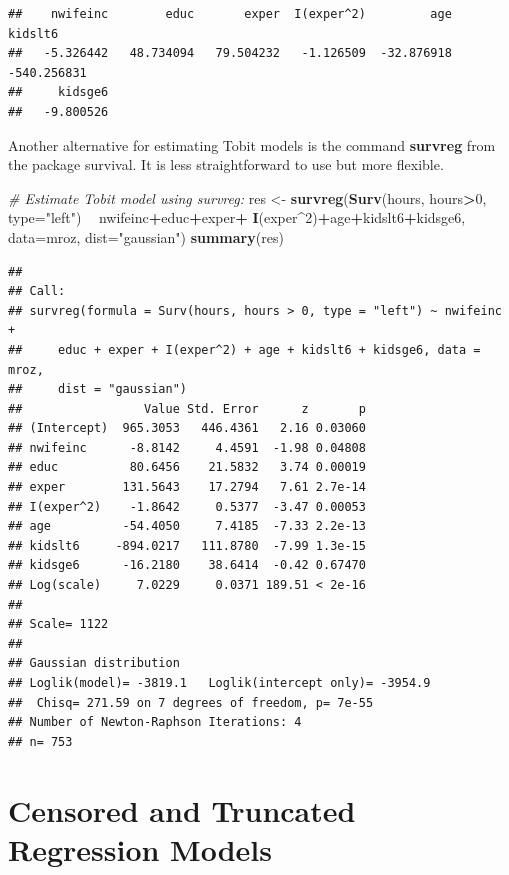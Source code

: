 \documentclass[]{book}
\newenvironment{Shaded}{\begin{snugshade}}{\end{snugshade}}
\newcommand{\CommentTok}[1]{\textcolor[rgb]{0.56,0.35,0.01}{\textit{#1}}}
\newcommand{\DataTypeTok}[1]{\textcolor[rgb]{0.13,0.29,0.53}{#1}}
\newcommand{\DecValTok}[1]{\textcolor[rgb]{0.00,0.00,0.81}{#1}}
\newcommand{\KeywordTok}[1]{\textcolor[rgb]{0.13,0.29,0.53}{\textbf{#1}}}
\newcommand{\NormalTok}[1]{#1}
\newcommand{\OperatorTok}[1]{\textcolor[rgb]{0.81,0.36,0.00}{\textbf{#1}}}
\newcommand{\StringTok}[1]{\textcolor[rgb]{0.31,0.60,0.02}{#1}}
\begin{document}
\begin{verbatim}
##    nwifeinc        educ       exper  I(exper^2)         age     kidslt6 
##   -5.326442   48.734094   79.504232   -1.126509  -32.876918 -540.256831 
##     kidsge6 
##   -9.800526
\end{verbatim}

Another alternative for estimating Tobit models is the command
\textbf{survreg} from the package survival. It is less straightforward
to use but more flexible.

\begin{Shaded}
\begin{Highlighting}[]
\CommentTok{# Estimate Tobit model using survreg:}
\NormalTok{res <-}\StringTok{ }\KeywordTok{survreg}\NormalTok{(}\KeywordTok{Surv}\NormalTok{(hours, hours}\OperatorTok{>}\DecValTok{0}\NormalTok{, }\DataTypeTok{type=}\StringTok{"left"}\NormalTok{) }\OperatorTok{~}\StringTok{ }\NormalTok{nwifeinc}\OperatorTok{+}\NormalTok{educ}\OperatorTok{+}\NormalTok{exper}\OperatorTok{+}
\StringTok{                 }\KeywordTok{I}\NormalTok{(exper}\OperatorTok{^}\DecValTok{2}\NormalTok{)}\OperatorTok{+}\NormalTok{age}\OperatorTok{+}\NormalTok{kidslt6}\OperatorTok{+}\NormalTok{kidsge6, }\DataTypeTok{data=}\NormalTok{mroz, }\DataTypeTok{dist=}\StringTok{"gaussian"}\NormalTok{)}
\KeywordTok{summary}\NormalTok{(res)}
\end{Highlighting}
\end{Shaded}

\begin{verbatim}
## 
## Call:
## survreg(formula = Surv(hours, hours > 0, type = "left") ~ nwifeinc + 
##     educ + exper + I(exper^2) + age + kidslt6 + kidsge6, data = mroz, 
##     dist = "gaussian")
##                 Value Std. Error      z       p
## (Intercept)  965.3053   446.4361   2.16 0.03060
## nwifeinc      -8.8142     4.4591  -1.98 0.04808
## educ          80.6456    21.5832   3.74 0.00019
## exper        131.5643    17.2794   7.61 2.7e-14
## I(exper^2)    -1.8642     0.5377  -3.47 0.00053
## age          -54.4050     7.4185  -7.33 2.2e-13
## kidslt6     -894.0217   111.8780  -7.99 1.3e-15
## kidsge6      -16.2180    38.6414  -0.42 0.67470
## Log(scale)     7.0229     0.0371 189.51 < 2e-16
## 
## Scale= 1122 
## 
## Gaussian distribution
## Loglik(model)= -3819.1   Loglik(intercept only)= -3954.9
##  Chisq= 271.59 on 7 degrees of freedom, p= 7e-55 
## Number of Newton-Raphson Iterations: 4 
## n= 753
\end{verbatim}

\hypertarget{censored-and-truncated-regression-models}{%
\section{Censored and Truncated Regression
Models}\label{censored-and-truncated-regression-models}}
\end{document}
